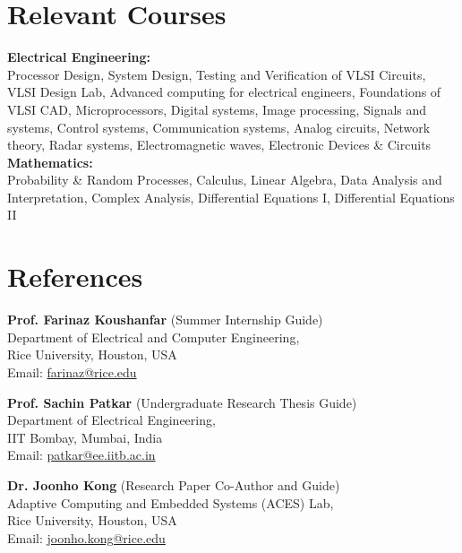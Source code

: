 \documentclass[margin,line]{resume}
\begin{document}
\begin{resume}
\section{\mysidestyle Relevant Courses}
\vspace{0mm}
    {\bf Electrical Engineering:} \\
	Processor Design, System Design, Testing and Verification of VLSI Circuits, VLSI Design Lab, Advanced computing for electrical engineers, Foundations of VLSI CAD, Microprocessors, Digital systems, Image processing, Signals and systems, Control systems, Communication systems, Analog circuits, Network theory, Radar systems, Electromagnetic waves, Electronic Devices \& Circuits\\
    {\bf Mathematics:} \\
	Probability \& Random Processes, Calculus, Linear Algebra, Data Analysis and Interpretation, Complex Analysis, Differential Equations I, Differential Equations II
	
\section{\mysidestyle References}
	\begin{list1}
    
	\item \textbf{Prof. Farinaz Koushanfar} (Summer Internship Guide)\\
	Department of Electrical and Computer Engineering,\\
	Rice University, Houston, USA\\
	Email: \url {farinaz@rice.edu}\\

	\item \textbf{Prof. Sachin Patkar} (Undergraduate Research Thesis Guide)\\
	Department of Electrical Engineering,\\
	IIT Bombay, Mumbai, India\\
	Email: \url {patkar@ee.iitb.ac.in}\\

	\item \textbf{Dr. Joonho Kong} (Research Paper Co-Author and Guide)\\
	Adaptive Computing and Embedded Systems (ACES) Lab,\\
	Rice University, Houston, USA\\
	Email: \url{joonho.kong@rice.edu}\\
    
	\end{list1}
\end{resume}
\end{document}
